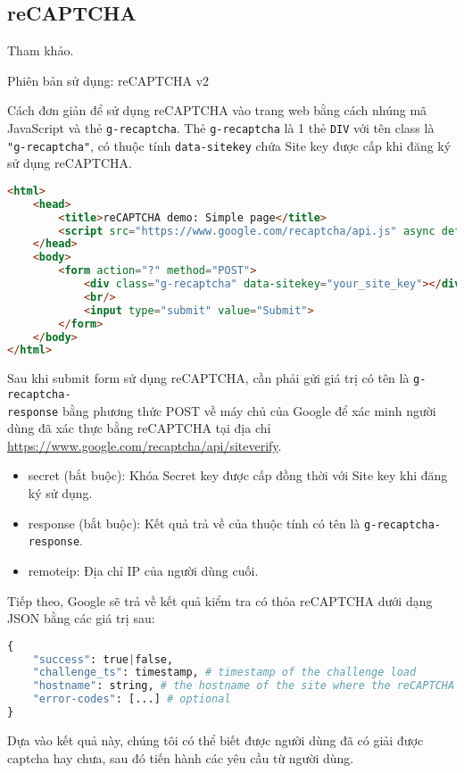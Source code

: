 \subsection{reCAPTCHA}
Tham khảo\cite{captcha}.
\\\par
Phiên bản sử dụng: reCAPTCHA v2
\\\par
Cách đơn giản để sử dụng reCAPTCHA vào trang web bằng cách nhúng mã JavaScript và thẻ \texttt{g-recaptcha}. Thẻ \texttt{g-recaptcha} là 1 thẻ \texttt{DIV} với tên class là \texttt{"g-recaptcha"}, có thuộc tính \texttt{data-sitekey} chứa Site key được cấp khi đăng ký sử dụng reCAPTCHA.
\begin{lstlisting}[language=HTML]
<html>
	<head>
		<title>reCAPTCHA demo: Simple page</title>
		<script src="https://www.google.com/recaptcha/api.js" async defer></script>
	</head>
	<body>
		<form action="?" method="POST">
			<div class="g-recaptcha" data-sitekey="your_site_key"></div>
			<br/>
			<input type="submit" value="Submit">
		</form>
	</body>
</html>
\end{lstlisting}
\par
Sau khi submit form sử dụng reCAPTCHA, cần phải gửi giá trị có tên là \texttt{g-recaptcha-\\response} bằng phương thức POST về máy chủ của Google để xác minh người dùng đã xác thực bằng reCAPTCHA tại địa chỉ \url{https://www.google.com/recaptcha/api/siteverify}.
\begin{itemize}
	\item secret (bắt buộc): Khóa Secret key được cấp đồng thời với Site key khi đăng ký sử dụng.
	\item response (bắt buộc): Kết quả trả về của thuộc tính có tên là \texttt{g-recaptcha-response}.
	\item remoteip: Địa chỉ IP của người dùng cuối.
\end{itemize}
\par
Tiếp theo, Google sẽ trả về kết quả kiểm tra có thỏa reCAPTCHA dưới dạng JSON bằng các giá trị sau:
\begin{lstlisting}[language=Python]
{
	"success": true|false,
	"challenge_ts": timestamp, # timestamp of the challenge load
	"hostname": string, # the hostname of the site where the reCAPTCHA was solved
	"error-codes": [...] # optional
}
\end{lstlisting}
\par
Dựa vào kết quả này, chúng tôi có thể biết được người dùng đã có giải được captcha hay chưa, sau đó tiến hành các yêu cầu từ người dùng.	
